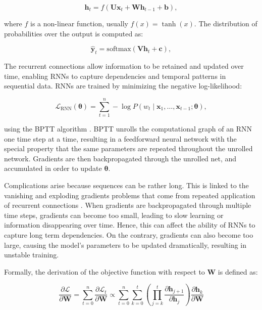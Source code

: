\begin{equation}
    \bm{h}_{t} = f(\bm{U}\bm{x}_t + \bm{W}\bm{h}_{t-1} + \bm{b}),  
\end{equation}

where $f$ is a non-linear function, usually $f(x) = \tanh(x)$. The distribution of probabilities over the output is computed as:

\begin{equation}
    \hat{\bm{y}}_t = \mathrm{softmax}(\bm{V}\bm{h}_t + \bm{c}),
\label{eq-rnn}
\end{equation}

The recurrent connections allow information to be retained and updated over time, enabling \acp{RNN} to capture dependencies and temporal patterns in sequential data. \acp{RNN} are trained by minimizing the negative log-likelihood:

\begin{equation}
    \mathcal{L}_{\mathrm{RNN}}(\bm{\theta}) = \sum_{t=1}^{n} - \log P(w_t \mid \bm{x}_1, \ldots, \bm{x}_{t-1}; \bm{\theta}),
\end{equation}

using the \ac{BPTT} algorithm \citep{werbos1990backpropagation}. \ac{BPTT} unrolls the computational graph of an \ac{RNN} one time step at a time, resulting in a feedforward neural network with the special property that the same parameters are repeated throughout the unrolled network. Gradients are then backpropagated through the unrolled net, and accumulated in order to update $\bm{\theta}$. 


Complications arise because sequences can be rather long. This is linked to the vanishing and exploding gradients problems that come from repeated application of recurrent connections \citep{hochreiter2001gradient}. When gradients are backpropagated through multiple time steps, gradients can become too small, leading to slow learning or information disappearing over time. Hence, this can affect the ability of \acp{RNN} to capture long term dependencies. On the contrary, gradients can also become too large, causing the model's parameters to be updated dramatically, resulting in unstable training. 

Formally, the derivation of the objective function with respect to $\bm{W}$ is defined as:

\begin{equation}
    \frac{\partial \mathcal{L}}{\partial \bm{W}} = \sum_{t=0}^{n} \frac{\partial \mathcal{L}_t}{\partial \bm{W}} \propto \sum_{t=0}^{n} \sum_{k=0}^{t} \left( \prod_{j = k} ^{t} \frac{\partial \bm{h}_{j+1}}{\partial \bm{h}_{j}} \right) \frac{\partial \bm{h}_{k}}{\partial \bm{W}}
\end{equation}

